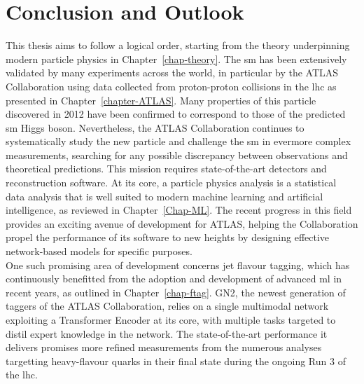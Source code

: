 \chapter{\color{oxfordblue} Conclusion and Outlook}\label{chap-Conclusion}
\ChapFrame
\vspace{-1cm}
This thesis aims to follow a logical order, starting from the theory underpinning modern particle physics in Chapter~\ref{chap-theory}. The \gls{sm} has been extensively validated by many experiments across the world, in particular by the ATLAS Collaboration using data collected from proton-proton collisions in the \gls{lhc} as presented in Chapter~\ref{chapter-ATLAS}. Many properties of this particle discovered in 2012 have been confirmed to correspond to those of the predicted \gls{sm} Higgs boson. Nevertheless, the ATLAS Collaboration continues to systematically study the new particle and challenge the \gls{sm} in evermore complex measurements, searching for any possible discrepancy between observations and theoretical predictions. This mission requires state-of-the-art detectors and reconstruction software. At its core, a particle physics analysis is a statistical data analysis that is well suited to modern machine learning and artificial intelligence, as reviewed in Chapter~\ref{Chap-ML}. The recent progress in this field provides an exciting avenue of development for ATLAS, helping the Collaboration propel the performance of its software to new heights by designing effective network-based models for specific purposes. \\

One such promising area of development concerns jet flavour tagging, which has continuously benefitted from the adoption and development of advanced \gls{ml} in recent years, as outlined in Chapter~\ref{chap-ftag}. GN2, the newest generation of taggers of the ATLAS Collaboration, relies on a single multimodal network exploiting a Transformer Encoder at its core, with multiple tasks targeted to distil expert knowledge in the network. The state-of-the-art performance it delivers promises more refined measurements from the numerous analyses targetting heavy-flavour quarks in their final state during the ongoing Run 3 of the \gls{lhc}. \\


